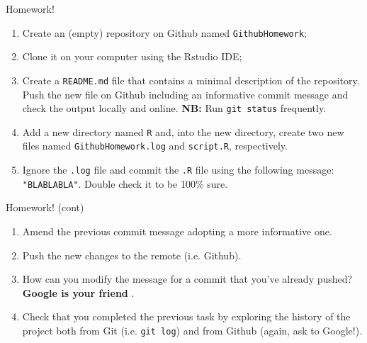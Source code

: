 \documentclass[
hyperref={bookmarks=false},
xcolor={dvipsnames,svgnames*,x11names*}, 
12pt
]{beamer}
\begin{document}
\begin{frame}{Homework!}
\vspace{-0.5cm}
\begin{enumerate}
\itemsep 1ex
\item Create an (empty) repository on Github named \texttt{GithubHomework}; 
\item Clone it on your computer using the Rstudio IDE; 
\item Create a \texttt{README.md} file that contains a minimal description of the repository. Push the new file on Github including an informative commit message and check the output locally and online. \textbf{NB:} Run \texttt{git status} frequently.  
\item Add a new directory named \texttt{R} and, into the new directory, create two new files named \texttt{GithubHomework.log} and \texttt{script.R}, respectively. 
\item Ignore the \texttt{.log} file and commit the \texttt{.R} file using the following message: \texttt{"BLABLABLA"}. Double check it to be 100\% sure. 
\setcounter{myenumi}{\value{enumi}}
\end{enumerate}
\end{frame}

\begin{frame}{Homework! (cont)}
\vspace{-0.5cm}
\begin{enumerate}
\setcounter{enumi}{\value{myenumi}}
\item Amend the previous commit message adopting a more informative one. 
\item Push the new changes to the remote (i.e. Github). 
\item How can you modify the message for a commit that you've already pushed? \textbf{Google is your friend} . 
\item Check that you completed the previous task by exploring the history of the project both from Git (i.e. \texttt{git log}) and from Github (again, ask to Google!). 
\end{enumerate}
\end{frame}
\end{document}
